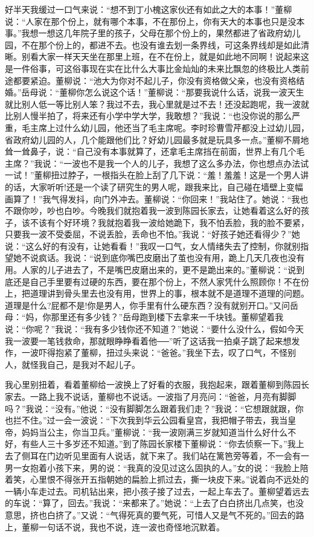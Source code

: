 \documentclass[12pt,oneside]{book}
\begin{document}
好半天我缓过一口气来说：``想不到丁小槐这家伙还有如此之大的本事！''董柳说：``人家在那个份上，就有哪个本事，不在那份上，你有天大的本事也只是没本事。''我想一想这几年院子里的孩子，父母在那个份上的，果然都进了省政府幼儿园，不在那个份上的，都进不去。也没有谁去划一条界线，可这条界线却是如此清晰。别看大家一样天天坐在那里上班，在不在份上，就是如此地不同啊！说起来这是一件俗事，可这俗事现在实在比什么大事比金灿灿的未来比飘忽的终极比人类前途都要紧迫。董柳说：``池大为你对不起儿子，你没有资格做父亲，也没有资格结婚。''岳母说：``董柳你怎么说这个话！''董柳说：``那要我说什么话，说我一波天生就比别人低一等比别人笨？我过不去，我心里就是过不去！还没起跑呢，我一波就比别人慢半拍了，将来还有小学中学大学，我敢想？''我说：``也没你说的那么严重，毛主席上过什么幼儿园，他还当了毛主席呢。李时珍曹雪芹都没上过幼儿园，省政府幼儿园的人，几个能跟他们比？好幼儿园最多就是玩具多一点。''董柳不屑地耸一耸鼻子，说：``自己没有本事就算了，还拿毛主席挡在前面，世界上有几个毛主席？''我说：``一波也不是我一个人的儿子，我想了这么多办法，你也想点办法试一试！''董柳扭过脖子，一根指头在脸上刮了几下说：``羞！羞羞！这是一个男人讲的话，大家听听!还是一个读了研究生的男人呢，跟我来比，自己碰在墙壁上变幅画算了！''我气得发抖，向门外冲去。董柳说：``你回来！''我站住了。她说：``我也不跟你吵，吵也白吵。今晚我们就抱着我一波到陈园长家去，让她看着这么好的孩子，该不该有个好环境？我就抱着我一波给她跪下，我不怕丢脸，我的脸不要紧，只要我一波不受委屈，不说丢脸，丢命也不怕。''我说：``好孩子她还看得少？''她说：``这么好的有没有，让她看看！''我叹一口气，女人情绪失去了控制，你就别指望她不说疯话。我说：``说到底你嘴巴皮磨出了茧也没有用，跪上几天几夜也没有用。人家的儿子进去了，不是嘴巴皮磨出来的，更不是跪出来的。''董柳说：``说到底还是自己手里要有过硬的东西，要在那个份上，不然人家凭什么照顾你！不在份上，把道理讲到骨头里去也没有用，世界上的事，根本就不是道理不道理的问题。道理是什么?屁都不是!你是男人，你手里有什么硬东西？没有就别开口。''又问岳母：``妈，你那里还有多少钱？''岳母跑到楼下去拿来一千块钱。董柳望着我说：``你呢？''我说：``我有多少钱你还不知道？''她说：``要什么没什么，假如今天我一波要一笔钱救命，那就眼睁睁看着他──''听了这话我一拍桌子跳了起来想发作，一波吓得抱紧了董柳，扭过头来说：``爸爸。''我坐下去，叹了口气，不怪别人，就怪我自己，是我对不起儿子。

我心里别扭着，看着董柳给一波换上了好看的衣服，我抱起来，跟着董柳到陈园长家去。一路上我不说话，董柳也不说话。一波指了月亮问：``爸爸，月亮有脚脚吗？''我说：``没有。''他说：``没有脚脚怎么跟着我们走？''我说：``它想跟就跟，你也拦不住。''过一会一波说：``下次我到华云公园看皇宫，我把帽子带去，我当皇帝，妈妈当公主，你当卫兵。''董柳说：``我一波刚满三岁就知道当什么好什么不好，有些人三十多岁还不知道。''到了陈园长家楼下董柳说：``你去侦察一下。''我上去了侧耳在门边听见里面有人说话，就下来了。我们站在篱笆旁等着，不一会有一男一女抱着小孩下来，男的说：``我真的没见过这么固执的人。''女的说：``我脸上陪着笑，心里恨不得张开五指朝她的扁脸上抓过去，撕一块皮下来。''说着向不远处的一辆小车走过去。司机钻出来，把小孩子接了过去，一起上车去了。董柳望着远去的车说：``算了，回去。''我说：``来都来了。''她说：``上去了白白挤出几点笑，也没意思，挤也白挤了。''又说：``气得死真的要气死，可惜人又是气不死的。''回去的路上，董柳一句话不说，我也不说，连一波也奇怪地沉默着。
\end{document}
